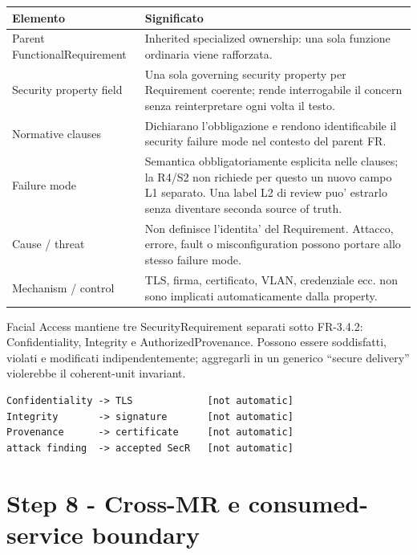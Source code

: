\documentclass[11pt,a4paper]{article}
\begin{document}
\begin{tabularx}{\textwidth}{L{45mm}Y}
\toprule
\textbf{Elemento} & \textbf{Significato} \\
\midrule
Parent FunctionalRequirement & Inherited specialized ownership: una sola funzione ordinaria viene rafforzata. \\
Security property field & Una sola governing security property per Requirement coerente; rende interrogabile il concern senza reinterpretare ogni volta il testo. \\
Normative clauses & Dichiarano l'obbligazione e rendono identificabile il security failure mode nel contesto del parent FR. \\
Failure mode & Semantica obbligatoriamente esplicita nelle clauses; la R4/S2 non richiede per questo un nuovo campo L1 separato. Una label L2 di review puo' estrarlo senza diventare seconda source of truth. \\
Cause / threat & Non definisce l'identita' del Requirement. Attacco, errore, fault o misconfiguration possono portare allo stesso failure mode. \\
Mechanism / control & TLS, firma, certificato, VLAN, credenziale ecc. non sono implicati automaticamente dalla property. \\
\bottomrule
\end{tabularx}

\begin{ddtaexample}[title={Perche' Confidentiality, Integrity e AuthorizedProvenance restano separate}]
Facial Access mantiene tre SecurityRequirement separati sotto FR-3.4.2: Confidentiality, Integrity e AuthorizedProvenance. Possono essere soddisfatti, violati e modificati indipendentemente; aggregarli in un generico ``secure delivery'' violerebbe il coherent-unit invariant.
\end{ddtaexample}

\begin{ddtaanti}[title={Property != mechanism != attack cause}]
\begin{lstlisting}
Confidentiality -> TLS             [not automatic]
Integrity       -> signature       [not automatic]
Provenance      -> certificate     [not automatic]
attack finding  -> accepted SecR   [not automatic]
\end{lstlisting}
\end{ddtaanti}

\section{Step 8 - Cross-MR e consumed-service boundary}
\closedtag
\end{document}
